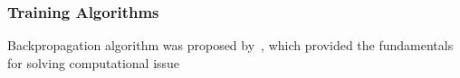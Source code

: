 \subsubsection{Training Algorithms}
Backpropagation algorithm was proposed by~\citet{werbos1975beyond}, which provided the fundamentals for solving computational issue